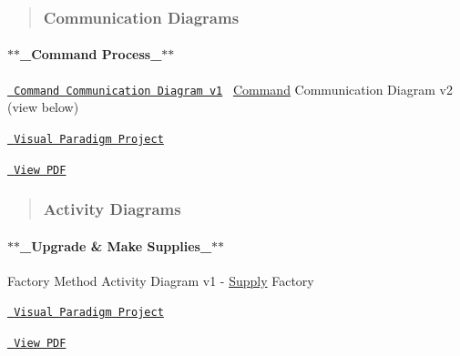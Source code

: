  \begin{quote}
\subsubsection*{Communication Diagrams}

\end{quote}
\paragraph*{$\ast$$\ast$\+\_\+\+Command Process\+\_\+$\ast$$\ast$  ~\newline
}

\href{https://drive.google.com/file/d/1Fgl2iJOJhOJaV1UmZeaMtXs7aDN2GplF/view?usp=share_link}{\texttt{ Command Communication Diagram v1}}~\newline
 \mbox{\hyperlink{class_command}{Command}} Communication Diagram v2 (view below)
\begin{DoxyItemize}
\item \href{https://drive.google.com/file/d/1ohsXV-Hly5W3cuXQPvUyfz8PDnhP1TGt/view?usp=share_link}{\texttt{ Visual Paradigm Project}}~\newline

\item \href{https://drive.google.com/file/d/1-ru-1h-dxi4MtKL1rTDNSH_aPk-wHZOx/view?usp=share_link}{\texttt{ View P\+DF}}~\newline

\end{DoxyItemize}



 \begin{quote}
\subsubsection*{Activity Diagrams}

\end{quote}
\paragraph*{$\ast$$\ast$\+\_\+\+Upgrade \& Make Supplies\+\_\+$\ast$$\ast$  ~\newline
}

Factory Method Activity Diagram v1 -\/ \mbox{\hyperlink{class_supply}{Supply}} Factory
\begin{DoxyItemize}
\item \href{https://drive.google.com/file/d/1EBdnFrqVyZ-9bZmklmUJZbSlaMK8xiKT/view?usp=share_link}{\texttt{ Visual Paradigm Project}}~\newline

\item \href{https://drive.google.com/file/d/1pZM0BkpUGqecUt8wBrSsRNL6fOtYuqQR/view?usp=share_link}{\texttt{ View P\+DF}}~\newline

\end{DoxyItemize}

